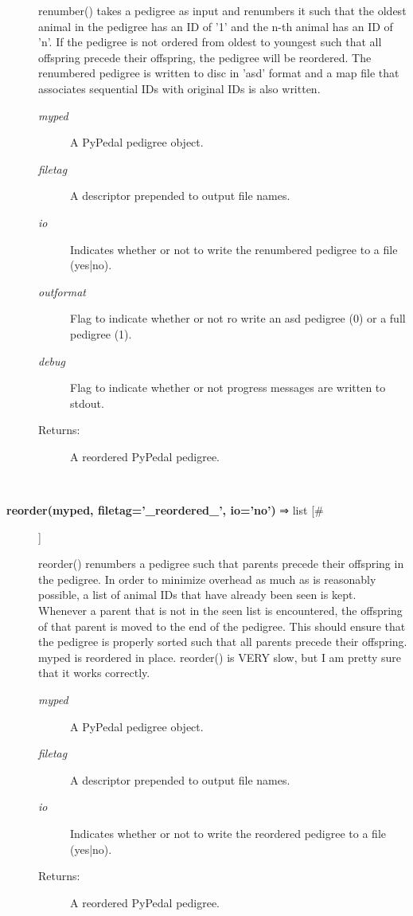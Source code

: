 \begin{description}
 renumber() takes a pedigree as input and renumbers it such that the oldest animal in the pedigree has an ID of '1' and the n-th animal has an ID of 'n'. If the pedigree is not ordered from oldest to youngest such that all offspring precede their offspring, the pedigree will be reordered. The renumbered pedigree is written to disc in 'asd' format and a map file that associates sequential IDs with original IDs is also written.
\begin{description}
\item[\emph{myped}
] A PyPedal pedigree object.
\item[\emph{filetag}
] A descriptor prepended to output file names.
\item[\emph{io}
] Indicates whether or not to write the renumbered pedigree to a file (yes|no).
\item[\emph{outformat}
] Flag to indicate whether or not ro write an asd pedigree (0) or a full pedigree (1).
\item[\emph{debug}
] Flag to indicate whether or not progress messages are written to stdout.
\item[Returns:] A reordered PyPedal pedigree.

\end{description}
\\ 

\item[\textbf{reorder(myped, filetag='\_reordered\_', io='no')}
 ⇒ list [\#]]

 reorder() renumbers a pedigree such that parents precede their offspring in the pedigree. In order to minimize overhead as much as is reasonably possible, a list of animal IDs that have already been seen is kept. Whenever a parent that is not in the seen list is encountered, the offspring of that parent is moved to the end of the pedigree. This should ensure that the pedigree is properly sorted such that all parents precede their offspring. myped is reordered in place. reorder() is VERY slow, but I am pretty sure that it works correctly.
\begin{description}
\item[\emph{myped}
] A PyPedal pedigree object.
\item[\emph{filetag}
] A descriptor prepended to output file names.
\item[\emph{io}
] Indicates whether or not to write the reordered pedigree to a file (yes|no).
\item[Returns:] A reordered PyPedal pedigree.

\end{description}
\\ 


\end{description}
